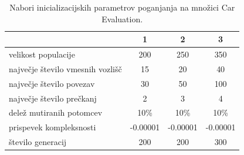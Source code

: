 \begin{table}[H]
    \begin{center}
        \begin{tabular}{||l c c c||}
            \hline
            & 1        & 2        & 3 \\ [0.5ex]
            \hline
            velikost populacije              & 200      & 250      & 350      \\
            \hline
            največje število vmesnih vozlišč & 15       & 20       & 40       \\
            \hline
            največje število povezav         & 30       & 50       & 100      \\
            \hline
            največje število prečkanj        & 2        & 3        & 4        \\
            \hline
            delež mutiranih potomcev         & 10\%     & 10\%     & 10\%     \\
            \hline
            prispevek kompleksnosti          & -0.00001 & -0.00001 & -0.00001 \\
            \hline
            število generacij                & 200      & 200      & 300      \\
            \hline
        \end{tabular}
    \end{center}
    \caption{Nabori inicializacijskih parametrov poganjanja na množici Car Evaluation.}
    \label{tab:param_car}
\end{table}

